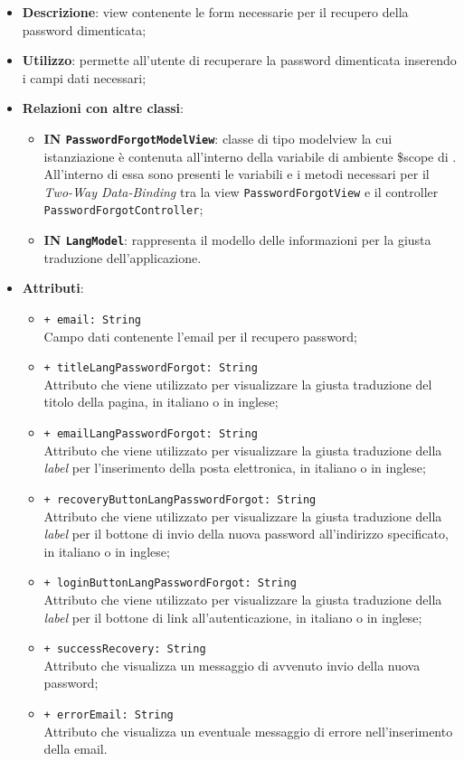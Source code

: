 \begin{itemize}
	\item \textbf{Descrizione}: view contenente le form necessarie per il recupero della password dimenticata;
	\item \textbf{Utilizzo}: permette all'utente di recuperare la password dimenticata inserendo i campi dati necessari;
	\item \textbf{Relazioni con altre classi}:
	\begin{itemize}
			\item \textbf{IN \texttt{PasswordForgotModelView}}: classe di tipo modelview la cui istanziazione è contenuta all'interno della variabile di ambiente \$scope di . All'interno di essa sono presenti le variabili e i metodi necessari per il \textit{Two-Way Data-Binding} tra la view \texttt{PasswordForgotView} e il controller \texttt{PasswordForgotController};
			\item \textbf{IN \texttt{LangModel}}: rappresenta il modello delle informazioni per la giusta traduzione dell'applicazione.
	\end{itemize}
	\item \textbf{Attributi}:
	\begin{itemize}
		\item \texttt{+ email: String} \\ Campo dati contenente l'email per il recupero password;
		\item \texttt{+ titleLangPasswordForgot: String} \\ Attributo che viene utilizzato per visualizzare la giusta traduzione del titolo della pagina, in italiano o in inglese;
		\item \texttt{+ emailLangPasswordForgot: String} \\ Attributo che viene utilizzato per visualizzare la giusta traduzione della \textit{label} per l'inserimento della posta elettronica, in italiano o in inglese;
		\item \texttt{+ recoveryButtonLangPasswordForgot: String} \\ Attributo che viene utilizzato per visualizzare la giusta traduzione della \textit{label} per il bottone di invio della nuova password all'indirizzo specificato, in italiano o in inglese;
		\item \texttt{+ loginButtonLangPasswordForgot: String} \\ Attributo che viene utilizzato per visualizzare la giusta traduzione della \textit{label} per il bottone di link all'autenticazione, in italiano o in inglese;
		\item \texttt{+ successRecovery: String} \\ Attributo che visualizza un messaggio di avvenuto invio della nuova password;
		\item \texttt{+ errorEmail: String} \\ Attributo che visualizza un eventuale messaggio di errore nell'inserimento della email.
	\end{itemize}
\end{itemize}